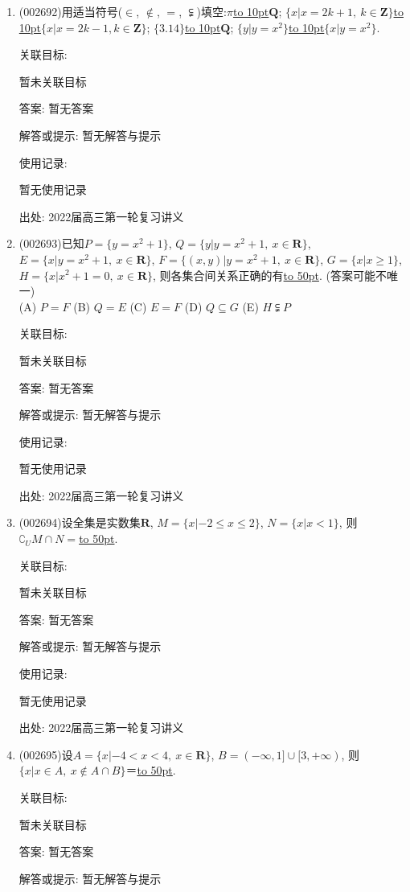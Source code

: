 \documentclass[10pt,a4paper]{article}
\newcommand{\blank}[1]{\underline{\hbox to #1pt{}}}
\begin{document}
\begin{enumerate}[1.]

\item { (002692)}用适当符号($\in$, $\notin$, $=$, $\subsetneqq$)填空:$\pi$\blank{10}$\mathbf{Q}$; $\{x|x=2k+1, \ k\in \mathbf{Z}\}$\blank{10}$\{x|x=2k-1,k\in \mathbf{Z}\}$; $\{3.14\}$\blank{10}$\mathbf{Q}$; $\{y|y=x^2\}$\blank{10}$\{x|y=x^2\}$.


关联目标:

暂未关联目标

答案: 暂无答案

解答或提示: 暂无解答与提示

使用记录:

暂无使用记录


出处: 2022届高三第一轮复习讲义
\item { (002693)}已知$P=\{y=x^2+1\}$, $Q=\{y|y=x^2+1, \ x\in \mathbf{R}\}$, $E=\{x|y=x^2+1, \  x\in \mathbf{R}\}$, $F=\{(x,y)|y=x^2+1, \ x\in \mathbf{R}\}$, $G=\{x|x\ge 1\}$, $H=\{x|x^2+1=0, \ x\in \mathbf{R}\}$, 则各集合间关系正确的有\blank{50}. (答案可能不唯一)\\
(A) $P=F$   (B) $Q=E$   (C) $E=F$   (D) $Q\subseteq G$  (E) $H\subsetneqq P$


关联目标:

暂未关联目标

答案: 暂无答案

解答或提示: 暂无解答与提示

使用记录:

暂无使用记录


出处: 2022届高三第一轮复习讲义
\item { (002694)}设全集是实数集$\mathbf{R}$, $M=\{x|-2 \le x\le 2\}$, $N=\{x|x<1\}$, 则$\complement_U M\cap N=$\blank{50}.


关联目标:

暂未关联目标

答案: 暂无答案

解答或提示: 暂无解答与提示

使用记录:

暂无使用记录


出处: 2022届高三第一轮复习讲义
\item { (002695)}设$A=\{x|-4<x<4, \ x\in \mathbf{R}\}$, $B=(-\infty,1]\cup [3,+\infty)$, 则$\{x|x\in A, \ x\notin A\cap B  \}$＝\blank{50}.


关联目标:

暂未关联目标

答案: 暂无答案

解答或提示: 暂无解答与提示


\end{enumerate}
\end{document}
